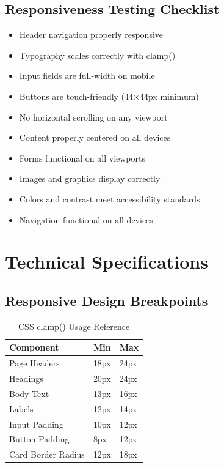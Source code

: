 \documentclass[11pt, a4paper]{report}
\begin{document}
\section{Responsiveness Testing Checklist}

\begin{itemize}
    \item[\textcolor{darkgreen}{\checkmark}] Header navigation properly responsive
    \item[\textcolor{darkgreen}{\checkmark}] Typography scales correctly with clamp()
    \item[\textcolor{darkgreen}{\checkmark}] Input fields are full-width on mobile
    \item[\textcolor{darkgreen}{\checkmark}] Buttons are touch-friendly (44×44px minimum)
    \item[\textcolor{darkgreen}{\checkmark}] No horizontal scrolling on any viewport
    \item[\textcolor{darkgreen}{\checkmark}] Content properly centered on all devices
    \item[\textcolor{darkgreen}{\checkmark}] Forms functional on all viewports
    \item[\textcolor{darkgreen}{\checkmark}] Images and graphics display correctly
    \item[\textcolor{darkgreen}{\checkmark}] Colors and contrast meet accessibility standards
    \item[\textcolor{darkgreen}{\checkmark}] Navigation functional on all devices
\end{itemize}

\chapter{Technical Specifications}

\section{Responsive Design Breakpoints}

\begin{table}[H]
    \centering
    \caption{CSS clamp() Usage Reference}
    \begin{tabular}{|l|l|l|}
        \hline
        \textbf{Component} & \textbf{Min} & \textbf{Max} \\
        \hline
        Page Headers & 18px & 24px \\
        Headings & 20px & 24px \\
        Body Text & 13px & 16px \\
        Labels & 12px & 14px \\
        Input Padding & 10px & 12px \\
        Button Padding & 8px & 12px \\
        Card Border Radius & 12px & 18px \\
        \hline
    \end{tabular}
\end{table}
\end{document}

